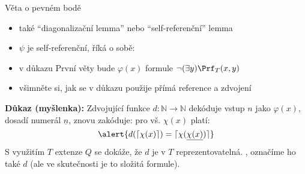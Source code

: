 \documentclass{beamer}
\begin{document}
\begin{frame}{Věta o pevném bodě}
    
    \pause

    \pause
    \begin{itemize}
        \item také ``diagonalizační lemma'' nebo ``self-referenční'' lemma\pause
        \item $\psi$ je \alert{self-referenční}, říká o sobě: \pause
        \item v důkazu První věty bude $\varphi(x)$ formule $\neg(\exists y)\Prf_T(x,y)$\pause
        \item všimněte si, jak se v důkazu použije přímá reference a zdvojení
    \end{itemize}

    \pause
    \textbf{Důkaz (myšlenka):} \alert{Zdvojující funkce} $d\colon\mathbb N\to\mathbb N$ dekóduje vstup $n$ jako $\varphi(x)$, dosadí numerál $\underline{n}$, znovu zakóduje: pro vš. $\chi(x)$ platí:
    $$
    \alert{d(\lceil \chi(x)\rceil)=\lceil\chi(\underline{\chi(x)})\rceil}
    $$
    \pause
    S využitím $T$ extenze $Q$ se dokáže, že $d$ je v $T$ \alert{reprezentovatelná}. , označíme ho také $d$ (ale ve skutečnosti je to složitá formule).
    
\end{frame}
\end{document}
